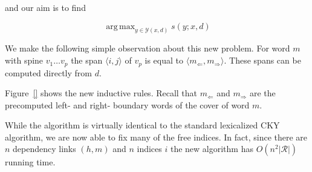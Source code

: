 \documentclass[11pt,letterpaper]{article}
\DeclareMathOperator*{\argmax}{arg\,max}
\newcommand{\rules}{\mathcal{R}}
\newcommand{\Left}[1]{#1_{\Leftarrow}}
\newcommand{\Right}[1]{#1_{\Rightarrow}}
\newcommand{\Span}[1]{\langle #1 \rangle}
\begin{document}




and our aim is to find

\[ \argmax_{y \in \mathcal{Y}(x, d)} s(y; x, d)\]

We make the following simple observation about this new problem. For word $m$ with spine $v_1 \ldots v_p$ the span $\Span{i,j}$ of $v_p$ is equal to $\langle \Left{m},\Right{m}\rangle$. These spans can be computed directly from $d$.






Figure~\ref{} shows the new inductive rules.
Recall that $\Left{m}$ and $\Right{m}$ are the precomputed left- and right- boundary words of the cover of word $m$.

While the algorithm is virtually identical to the standard lexicalized CKY algorithm, we are now able to fix many of the free indices. In fact, since there are $n$ dependency links $(h, m)$ and $n$ indices $i$ the new algorithm has $O(n^2|\rules|)$ running time.
\end{document}
